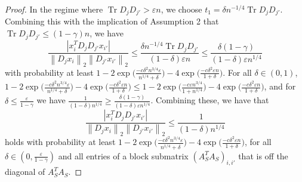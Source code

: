 \documentclass{article} %
\newcommand{\twonorm}[1]{\left\|#1\right\|_{2}}
\DeclareMathOperator{\Tr}{Tr}
\newcommand{\n}{\ensuremath{n}}
\newcommand{\1}{\ensuremath{{\sf (i)}}}
\newcommand{\2}{\ensuremath{{\sf (ii)}}}
\newcommand{\3}{\ensuremath{{\sf (iii)}}}
\newcommand{\4}{\ensuremath{{\sf (iv)}}}
\newcommand{\5}{\ensuremath{{\sf (v)}}}
\newcommand{\6}{\ensuremath{{\sf (vi)}}}
\begin{document}
\begin{proof}
In the regime where $\Tr{D_jD_{j'}} > \varepsilon \n$, we choose $t_1 = \delta \n^{-1/4} \Tr{D_jD_{j'}} $. Combining this with the implication of Assumption 2 that $\Tr{D_jD_{j'}} \leq (1-\gamma)\n$, we have
\begin{equation*}
    \frac{|x_i^TD_jD_{j'}x_{i'}|}{\twonorm{D_jx_i}\twonorm{D_{j'}x_{i'}}} \leq \frac{\delta \n^{-1/4} \Tr{D_jD_{j'}}}{(1-\delta)\varepsilon \n} \leq \frac{\delta  (1-\gamma)}{(1-\delta)\varepsilon \n^{1/4}}
 \end{equation*}
with probability at least $1 - 2\exp{\big(\frac{-c\delta^2 \n^{3/4} \varepsilon}{\n^{1/4} +\delta  }\big)} - 4\exp{\big(\frac{-c\delta^2\varepsilon \n}{1+\delta}\big)}$. 
For all $\delta \in (0,1)$, $1 - 2\exp{\big(\frac{-c\delta^2 \n^{3/4} \varepsilon}{\n^{1/4} +\delta  }\big)} - 4\exp{\big(\frac{-c\delta^2\varepsilon \n}{1+\delta}\big)} \leq 1 - 2\exp{\big(\frac{-c\varepsilon\n^{3/4}}{1 + \n^{1/4}}\big)} - 4\exp{\big(\frac{-c\delta^2\varepsilon \n}{1+\delta}\big)}$, and for $\delta \leq \frac{\varepsilon}{1-\gamma}$ we have $\frac{ 1}{(1-\delta) \n^{1/4}} \geq \frac{\delta  (1-\gamma)}{(1-\delta)\varepsilon \n^{1/4}}$. Combining these, we have that
\begin{equation*}
    \frac{|x_i^TD_jD_{j'}x_{i'}|}{\twonorm{D_jx_i}\twonorm{D_{j'}x_{i'}}} \leq \frac{ 1}{(1-\delta) \n^{1/4}}
\end{equation*}
holds with probability at least $1 - 2\exp{\big(\frac{-c\delta^2 \n^{3/4} \varepsilon}{\n^{1/4} +\delta  }\big)} - 4\exp{\big(\frac{-c\delta^2\varepsilon \n}{1+\delta}\big)}$, for all $\delta \in (0, \frac{\varepsilon}{1-\gamma})$ and all entries of a block submatrix $(A_S^TA_S)_{i,i'}$ that is off the diagonal of $A_S^TA_S$. 


\end{proof}
\end{document}
